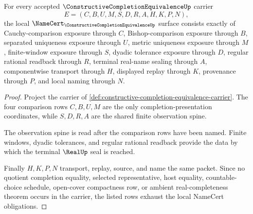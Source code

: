 \begin{theorem}
\label{thm:constructive-completion-equivalence-namecert-obligations}
For every accepted $\ConstructiveCompletionEquivalenceUp$ carrier
$$
E=(C,B,U,M,S,D,R,A,H,K,P,N),
$$
the local $\NameCert_{\ConstructiveCompletionEquivalenceUp}$ surface consists exactly of Cauchy-comparison exposure through $C$, Bishop-comparison exposure through $B$, separated uniqueness exposure through $U$, metric uniqueness exposure through $M$, finite-window exposure through $S$, dyadic tolerance exposure through $D$, regular rational readback through $R$, terminal real-name sealing through $A$, componentwise transport through $H$, displayed replay through $K$, provenance through $P$, and local naming through $N$.
\end{theorem}
\begin{proof}
Project the carrier of \autoref{def:constructive-completion-equivalence-carrier}. The four comparison rows $C,B,U,M$ are the only completion-presentation coordinates, while $S,D,R,A$ are the shared finite observation spine.

The observation spine is read after the comparison rows have been named. Finite windows, dyadic tolerances, and regular rational readback provide the data by which the terminal $\RealUp$ seal is reached.

Finally $H,K,P,N$ transport, replay, source, and name the same packet. Since no quotient completion equality, selected representative, host equality, countable-choice schedule, open-cover compactness row, or ambient real-completeness theorem occurs in the carrier, the listed rows exhaust the local NameCert obligations.
\end{proof}

